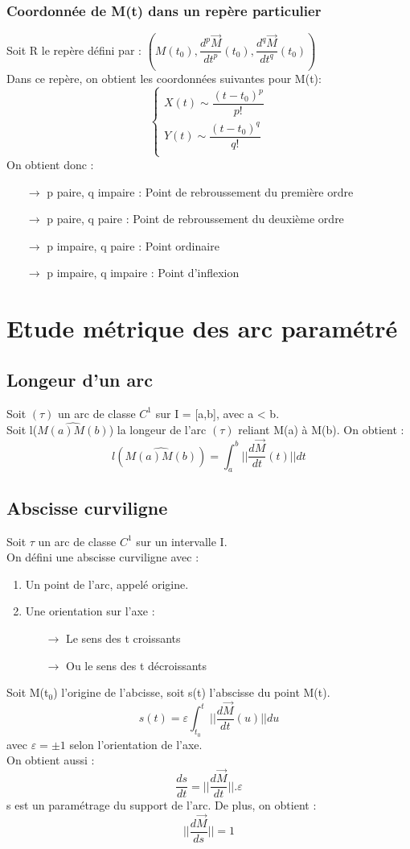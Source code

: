 \subsubsection{Coordonnée de M(t) dans un repère particulier}
Soit R le repère défini par : $(M(t_0),\dfrac{d^p\overrightarrow{M}}{dt^p}(t_0),\dfrac{d^q\overrightarrow{M}}{dt^q}(t_0))$\\
Dans ce repère, on obtient les coordonnées suivantes pour M(t): 
\[\left\{\begin{array}{l}
  X(t) \sim \dfrac{(t-t_0)^p}{p!}\\
  Y(t) \sim \dfrac{(t-t_0)^q}{q!}\\
  \end{array}\right.\]
On obtient donc :
\begin{itemize}
 \item[$\rightarrow$]p paire, q impaire : Point de rebroussement du première ordre
 \item[$\rightarrow$]p paire, q paire : Point de rebroussement du deuxième ordre
 \item[$\rightarrow$]p impaire, q paire : Point ordinaire
 \item[$\rightarrow$]p impaire, q impaire : Point d'inflexion
\end{itemize}
\section{Etude métrique des arc paramétré}
\subsection{Longeur d'un arc}
Soit $(\tau)$ un arc de classe $C^1$ sur I = [a,b], avec a < b.\\ Soit l($\widehat{M(a)M(b)}$) la longeur de l'arc $(\tau)$ reliant M(a) à M(b). On obtient : 
$$l(\widehat{M(a)M(b)}) = \int_a^b ||\dfrac{d\overrightarrow{M}}{dt}(t)||dt$$
\subsection{Abscisse curviligne}
Soit $\tau$ un arc de classe $C^1$ sur un intervalle I.\\
On défini une abscisse curviligne avec :
\begin{enumerate}[1-]
 \item Un point de l'arc, appelé origine.
 \item Une orientation sur l'axe : 
\begin{itemize}
 \item[$\rightarrow$] Le sens des t croissants
 \item[$\rightarrow$] Ou le sens des t décroissants
\end{itemize}
\end{enumerate}
Soit M(t$_0$) l'origine de l'abcisse, soit s(t) l'abscisse du point M(t).
$$s(t) = \varepsilon \int_{t_0}^t ||\dfrac{d\overrightarrow{M}}{dt}(u)||du$$
avec $\varepsilon = \pm 1$ selon l'orientation de l'axe.\\
On obtient aussi : 
$$\dfrac{ds}{dt} = ||\dfrac{d\overrightarrow{M}}{dt}||.\varepsilon$$
s est un paramétrage du support de l'arc. De plus, on obtient : 
$$||\dfrac{d\overrightarrow{M}}{ds}|| = 1$$

